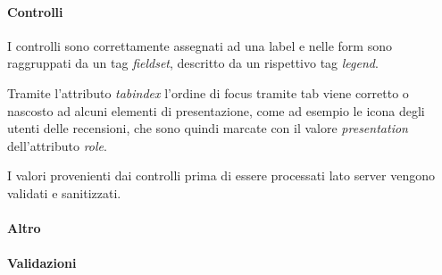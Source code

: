 \paragraph{Controlli}
I controlli sono correttamente assegnati ad una label e nelle form sono raggruppati da un tag \textit{fieldset}, descritto da un rispettivo tag \textit{legend}.


Tramite l'attributo \textit{tabindex} l'ordine di focus tramite tab viene corretto o nascosto ad alcuni elementi di presentazione, come ad esempio le icona degli utenti delle recensioni, che sono quindi marcate con il valore \textit{presentation} dell'attributo \textit{role}.


I valori provenienti dai controlli prima di essere processati lato server vengono validati e sanitizzati.

\paragraph{Altro}

\paragraph{Validazioni}

